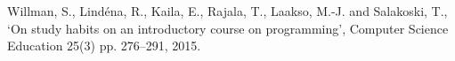 \documentclass[conference,compsoc]{IEEEtran}
\begin{document}
\begin{thebibliography}{10}
Willman, S., Lind\'ena, R., Kaila, E., Rajala, T., Laakso, M.-J. and
Salakoski, T., `On study habits on an introductory course on
programming', Computer Science Education 25(3) pp. 276--291, 2015.
 





\end{thebibliography}




\end{document}
